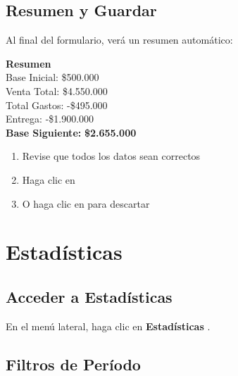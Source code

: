 \documentclass[12pt,a4paper]{article}
\begin{document}
\subsection{Resumen y Guardar}

Al final del formulario, verá un resumen automático:

\begin{center}
\begin{tcolorbox}[colback=primary!5,colframe=primary,width=10cm]
\textbf{Resumen}\\[0.3cm]
Base Inicial: \hfill \$500.000\\
Venta Total: \hfill \$4.550.000\\
Total Gastos: \hfill -\$495.000\\
Entrega: \hfill -\$1.900.000\\
\midrule
\textbf{Base Siguiente:} \hfill \textbf{\$2.655.000}
\end{tcolorbox}
\end{center}

\begin{tcolorbox}[colback=green!10,colframe=green!50!black,title=\faCheckCircle~ Guardar]
\begin{enumerate}
    \item Revise que todos los datos sean correctos
    \item Haga clic en 
    \item O haga clic en  para descartar
\end{enumerate}
\end{tcolorbox}

\newpage

\section{Estadísticas}

\subsection{Acceder a Estadísticas}

En el menú lateral, haga clic en \textbf{Estadísticas} \faChartBar.

\subsection{Filtros de Período}
\end{document}
